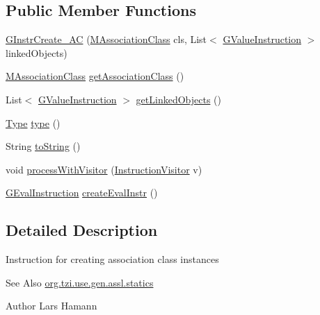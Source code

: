 \subsection*{Public Member Functions}
\begin{DoxyCompactItemize}
\item 
\hyperlink{classorg_1_1tzi_1_1use_1_1gen_1_1assl_1_1statics_1_1_g_instr_create___a_c_a1b221b82af3744717ba24f9a04944c2d}{G\-Instr\-Create\-\_\-\-A\-C} (\hyperlink{interfaceorg_1_1tzi_1_1use_1_1uml_1_1mm_1_1_m_association_class}{M\-Association\-Class} cls, List$<$ \hyperlink{interfaceorg_1_1tzi_1_1use_1_1gen_1_1assl_1_1statics_1_1_g_value_instruction}{G\-Value\-Instruction} $>$ linked\-Objects)
\item 
\hyperlink{interfaceorg_1_1tzi_1_1use_1_1uml_1_1mm_1_1_m_association_class}{M\-Association\-Class} \hyperlink{classorg_1_1tzi_1_1use_1_1gen_1_1assl_1_1statics_1_1_g_instr_create___a_c_a06e711d4219a54bc4b2e683bff158cf1}{get\-Association\-Class} ()
\item 
List$<$ \hyperlink{interfaceorg_1_1tzi_1_1use_1_1gen_1_1assl_1_1statics_1_1_g_value_instruction}{G\-Value\-Instruction} $>$ \hyperlink{classorg_1_1tzi_1_1use_1_1gen_1_1assl_1_1statics_1_1_g_instr_create___a_c_a2bb9b263da411c8e696e9575ad42ca9e}{get\-Linked\-Objects} ()
\item 
\hyperlink{interfaceorg_1_1tzi_1_1use_1_1uml_1_1ocl_1_1type_1_1_type}{Type} \hyperlink{classorg_1_1tzi_1_1use_1_1gen_1_1assl_1_1statics_1_1_g_instr_create___a_c_a01263fd164e9f308532760210c7ba91f}{type} ()
\item 
String \hyperlink{classorg_1_1tzi_1_1use_1_1gen_1_1assl_1_1statics_1_1_g_instr_create___a_c_a46ad93f4bd0e7bff499553f40ac4ac2c}{to\-String} ()
\item 
void \hyperlink{classorg_1_1tzi_1_1use_1_1gen_1_1assl_1_1statics_1_1_g_instr_create___a_c_a473a364e4ae94bdec854d67b2534bfcf}{process\-With\-Visitor} (\hyperlink{interfaceorg_1_1tzi_1_1use_1_1gen_1_1assl_1_1statics_1_1_instruction_visitor}{Instruction\-Visitor} v)
\item 
\hyperlink{classorg_1_1tzi_1_1use_1_1gen_1_1assl_1_1dynamics_1_1_g_eval_instruction}{G\-Eval\-Instruction} \hyperlink{classorg_1_1tzi_1_1use_1_1gen_1_1assl_1_1statics_1_1_g_instr_create___a_c_a9590bf05b25b192403818a555d5ea616}{create\-Eval\-Instr} ()
\end{DoxyCompactItemize}


\subsection{Detailed Description}
Instruction for creating association class instances \begin{DoxySeeAlso}{See Also}
\hyperlink{namespaceorg_1_1tzi_1_1use_1_1gen_1_1assl_1_1statics}{org.\-tzi.\-use.\-gen.\-assl.\-statics} 
\end{DoxySeeAlso}
\begin{DoxyAuthor}{Author}
Lars Hamann 
\end{DoxyAuthor}


